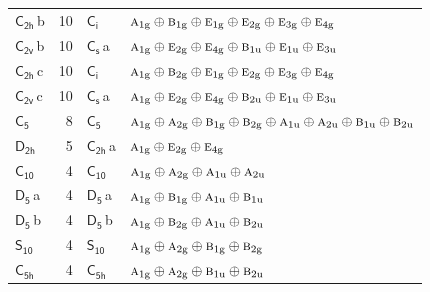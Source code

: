 \documentclass[10pt,a4paper]{article}
\numberwithin{equation}{section}
\newcommand{\grp}[1]{\mathsf{#1}}
\newcommand{\irr}[1]{\text{\normalfont\scshape #1}}
\newcommand{\ptag}[1]{\mathrm{#1}}
\newcommand{\clsletter}[1]{\,{\scriptsize\color{black!55}#1}}
\newlength{\fillwidth}\newlength{\cellwidth}\newlength{\colwidth}
\begin{document}
{\begin{longtable}{@{}lrl>{\RaggedRight\arraybackslash}p{\fillwidth}@{}}
\href{C2h.pdf}{$\grp{C_{2h}}$}\clsletter{b} & 10 & \href{S2.pdf}{$\grp{C_{i}}$} & $\irr{a}_{1\ptag{g}}\oplus \irr{b}_{1\ptag{g}}\oplus \irr{e}_{1\ptag{g}}\oplus \irr{e}_{2\ptag{g}}\oplus \irr{e}_{3\ptag{g}}\oplus \irr{e}_{4\ptag{g}}$\\
\href{C2v.pdf}{$\grp{C_{2v}}$}\clsletter{b} & 10 & \href{C1v.pdf}{$\grp{C_{s}}$}\clsletter{a} & $\irr{a}_{1\ptag{g}}\oplus \irr{e}_{2\ptag{g}}\oplus \irr{e}_{4\ptag{g}}\oplus \irr{b}_{1\ptag{u}}\oplus \irr{e}_{1\ptag{u}}\oplus \irr{e}_{3\ptag{u}}$\\
\href{C2h.pdf}{$\grp{C_{2h}}$}\clsletter{c} & 10 & \href{S2.pdf}{$\grp{C_{i}}$} & $\irr{a}_{1\ptag{g}}\oplus \irr{b}_{2\ptag{g}}\oplus \irr{e}_{1\ptag{g}}\oplus \irr{e}_{2\ptag{g}}\oplus \irr{e}_{3\ptag{g}}\oplus \irr{e}_{4\ptag{g}}$\\
\href{C2v.pdf}{$\grp{C_{2v}}$}\clsletter{c} & 10 & \href{C1v.pdf}{$\grp{C_{s}}$}\clsletter{a} & $\irr{a}_{1\ptag{g}}\oplus \irr{e}_{2\ptag{g}}\oplus \irr{e}_{4\ptag{g}}\oplus \irr{b}_{2\ptag{u}}\oplus \irr{e}_{1\ptag{u}}\oplus \irr{e}_{3\ptag{u}}$\\
\href{C5.pdf}{$\grp{C_{5}}$} & 8 & \href{C5.pdf}{$\grp{C_{5}}$} & $\irr{a}_{1\ptag{g}}\oplus \irr{a}_{2\ptag{g}}\oplus \irr{b}_{1\ptag{g}}\oplus \irr{b}_{2\ptag{g}}\oplus \irr{a}_{1\ptag{u}}\oplus \irr{a}_{2\ptag{u}}\oplus \irr{b}_{1\ptag{u}}\oplus \irr{b}_{2\ptag{u}}$\\
\href{D2h.pdf}{$\grp{D_{2h}}$} & 5 & \href{C2h.pdf}{$\grp{C_{2h}}$}\clsletter{a} & $\irr{a}_{1\ptag{g}}\oplus \irr{e}_{2\ptag{g}}\oplus \irr{e}_{4\ptag{g}}$\\
\href{C10.pdf}{$\grp{C_{10}}$} & 4 & \href{C10.pdf}{$\grp{C_{10}}$} & $\irr{a}_{1\ptag{g}}\oplus \irr{a}_{2\ptag{g}}\oplus \irr{a}_{1\ptag{u}}\oplus \irr{a}_{2\ptag{u}}$\\
\href{D5.pdf}{$\grp{D_{5}}$}\clsletter{a} & 4 & \href{D5.pdf}{$\grp{D_{5}}$}\clsletter{a} & $\irr{a}_{1\ptag{g}}\oplus \irr{b}_{1\ptag{g}}\oplus \irr{a}_{1\ptag{u}}\oplus \irr{b}_{1\ptag{u}}$\\
\href{D5.pdf}{$\grp{D_{5}}$}\clsletter{b} & 4 & \href{D5.pdf}{$\grp{D_{5}}$}\clsletter{b} & $\irr{a}_{1\ptag{g}}\oplus \irr{b}_{2\ptag{g}}\oplus \irr{a}_{1\ptag{u}}\oplus \irr{b}_{2\ptag{u}}$\\
\href{S10.pdf}{$\grp{S_{10}}$} & 4 & \href{S10.pdf}{$\grp{S_{10}}$} & $\irr{a}_{1\ptag{g}}\oplus \irr{a}_{2\ptag{g}}\oplus \irr{b}_{1\ptag{g}}\oplus \irr{b}_{2\ptag{g}}$\\
\href{C5h.pdf}{$\grp{C_{5h}}$} & 4 & \href{C5h.pdf}{$\grp{C_{5h}}$} & $\irr{a}_{1\ptag{g}}\oplus \irr{a}_{2\ptag{g}}\oplus \irr{b}_{1\ptag{u}}\oplus \irr{b}_{2\ptag{u}}$\\

\end{longtable}}
\end{document}
